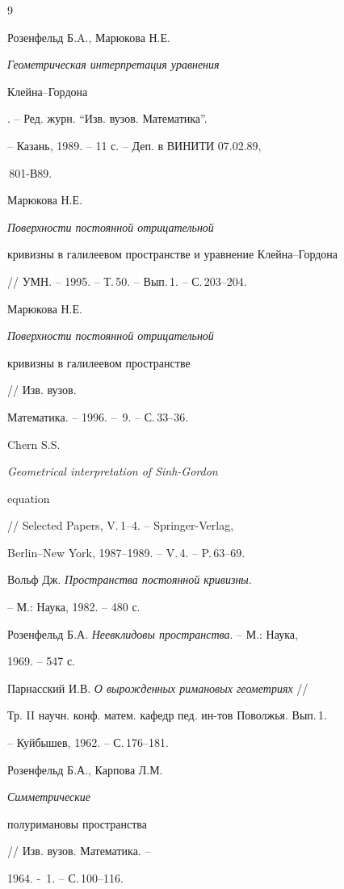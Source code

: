 \begin{thebibliography}{9}







Розенфельд Б.A., Марюкова Н.Е.


{\em Геометрическая интерпретация уравнения


Клейна--Гордона}. -- Ред. журн. ``Изв. вузов. Математика''.


-- Казань, 1989. -- 11 с. -- Деп. в ВИНИТИ 07.02.89,


\No\,801-В89.




Марюкова Н.Е. {\em Поверхности постоянной отрицательной


кривизны в галилеевом пространстве и уравнение Клейна--Гордона}


// УМН. -- 1995. -- Т.\,50. -- Вып.\,1. -- С.\,203--204.




Марюкова Н.Е. {\em Поверхности постоянной отрицательной


кривизны в галилеевом пространстве} // Изв. вузов.


Математика. -- 1996. -- \No\,9. -- С.\,33--36.




Chern S.S. {\em Geometrical interpretation of Sinh-Gordon


equation} // Selected Papers, V.\,1--4. -- Springer-Verlag,


Berlin--New York, 1987--1989. -- V.\,4. -- P.\,63--69.




Вольф Дж. {\em Пространства постоянной кривизны}. 


-- М.: Наука, 1982. -- 480 с. %




Розенфельд Б.А. {\em Неевклидовы пространства}. -- М.: Наука,


1969. -- 547 с.




Парнасский И.В. {\em О вырожденных римановых геометриях} //


Тр. II научн. конф. матем. кафедр пед. ин-тов Поволжья. Вып.\,1.


-- Куйбышев, 1962. -- С.\,176--181.




Розенфельд Б.А., Карпова Л.М. {\em Симметрические


полуримановы пространства} // Изв. вузов. Математика. --


1964. - \No\,1. -- С.\,100--116.





\end{thebibliography}





